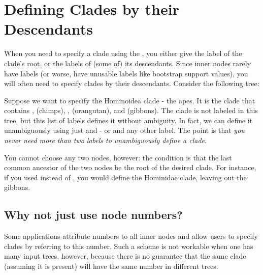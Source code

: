 
\chapter[sct_def_clades]{Defining Clades by their Descendants}

When you need to specify a clade using the \nutils{}, you either give the label
of the clade's root, or the labels of (some of) its descendants. Since inner
nodes rarely have labels (or worse, have unusable labels like bootstrap
support values), you will often need to specify clades by their descendants.
Consider the following tree:

\startalignment[center]
\stopalignment

Suppose we want to specify the Hominoidea clade - the apes. It is
the clade that contains ,  (chimps), ,
 (orangutan), and  (gibbons). The clade is not
labeled in this tree, but this list of labels defines it without ambiguity. In
fact, we can define it unambiguously using just  and
 - or  and any other label. The point is that
{\em you never need more than two labels to unambiguously define a clade}.

You cannot choose any two nodes, however: the condition is that the last
common ancestor of the two nodes be the root of the desired clade. For
instance, if you used  instead of , you would
define the Hominidae clade, leaving out the gibbons.

\section{Why not just use node numbers?}

Some applications attribute numbers to all inner nodes and allow users to
specify clades by referring to this number. Such a scheme is not workable when
one has many input trees, however, because there is no guarantee that the same
clade (assuming it is present) will have the same number in different trees.
